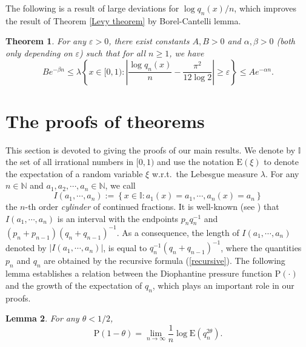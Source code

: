 \documentclass[reqno]{amsart}
\newtheorem{theorem}{Theorem}[section]
\newtheorem{lemma}[theorem]{Lemma}
\theoremstyle{definition}
\numberwithin{equation}{section}
\begin{document}
The following is a result of large deviations for $\log q_n(x)/n$, which improves the result of Theorem \ref{Levy theorem} by Borel-Cantelli lemma.

\begin{theorem}\label{Large deviations}
For any $\varepsilon > 0$, there exist constants $A,B > 0$ and $\alpha, \beta > 0$ (both only depending on $\varepsilon$) such that for all $n \geq 1$, we have
 \[
Be^{-\beta n} \leq \lambda\left\{x \in [0,1):\left|\frac{\log q_n(x)}{n}- \frac{\pi^2}{12\log2}\right| \geq \varepsilon\right\} \leq Ae^{-\alpha n}.
\]
\end{theorem}

\section{The proofs of theorems}

This section is devoted to giving the proofs of our main results. We denote by $\mathbb{I}$ the set of all irrational numbers in $[0,1)$ and use the notation $\mathrm{E}(\xi)$ to denote the expectation of a random variable $\xi$ w.r.t.~the Lebesgue measure $\lambda$.
 For any $n \in \mathbb{N}$ and $a_1, a_2, \cdots, a_n\in \mathbb{N}$, we call
\begin{equation*}
I(a_1, \cdots, a_n):= \left\{x \in \mathbb{I}: a_1(x)=a_1, \cdots, a_n(x)=a_n\right\}
\end{equation*}
the $n$-th order \emph{cylinder} of continued fractions. It is well-known (see \cite{lesDK02, lesIK02}) that $I(a_1, \cdots, a_n)$ is an interval with the endpoints $p_nq_n^{-1}$ and $(p_n +p_{n-1})(q_n +q_{n-1})^{-1}$. As a consequence, the length of $I(a_1, \cdots, a_n)$ denoted by $|I(a_1, \cdots, a_n)|$, is equal to $q_n^{-1}(q_n+q_{n-1})^{-1}$, where the quantities $p_n$ and $q_n$ are obtained by the recursive formula (\ref{recursive}).
The following lemma establishes a relation between the Diophantine pressure function $\mathrm{P}(\cdot)$ and the growth of the expectation of $q_n$, which plays an important role in our proofs.

\begin{lemma}\label{proofs}
For any $\theta <1/2$,
\[
\mathrm{P}(1-\theta) = \lim_{n \to \infty}\frac{1}{n} \log \mathrm{E}\left(q_n^{2\theta}\right).
\]
\end{lemma}
\end{document}
